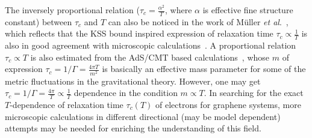 \documentclass[%
 reprint,
 amsmath,amssymb,
 aps,
]{revtex4-2}
\begin{document}
    The inversely proportional relation ($\tau_c=\frac{\alpha^2}{T}$, where $\alpha$ is effective fine structure constant) between $\tau_c$ 
    and $T$ can also be noticed in the work of Müller {\it et al}.~\cite{24PhysRevLett.103.025301}, which reflects that the KSS bound inspired expression 
    of relaxation time $\tau_c\propto\frac{1}{T}$ is also in good agreement with microscopic calculations~\cite{24PhysRevLett.103.025301}.
    A proportional relation $\tau_{c}\propto T$ is also estimated from the AdS/CMT based calculations~\cite{PhysRevD.88.086003,Andrade2014-fk,Davison2015-ow}, 
    whose $m$ of expression $\tau_c=1/\Gamma = \frac{4\pi T}{m^2}$ is basically an effective mass parameter for some of the metric 
    fluctuations in the gravitational theory. However, one may get $\tau_c=1/\Gamma = \frac{4\pi}{T} \propto \frac{1}{T}$ dependence in
    the condition $m \propto T$. In searching for the exact $T$-dependence of relaxation time $\tau_c(T)$ of electrons for graphene systems, more
    microscopic calculations in different directional (may be model dependent) attempts may be needed for enriching the understanding of this field.

\end{document}
